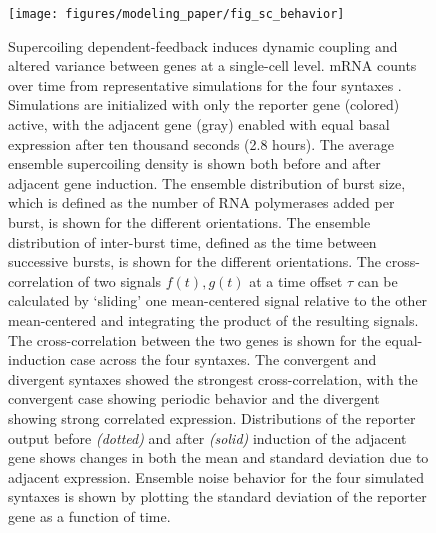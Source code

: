 \documentclass[11pt]{article}
\begin{document}
\begin{figure}[htbp]
    \centering
    {\texttt{[image: figures/modeling\_paper/fig\_sc\_behavior]}
    \label{fig:sc_examples}
    \label{fig:sc_density}
    \label{fig:burst_size_dynamics}
    \label{fig:interburst_time_dynamics}
    \label{fig:cross_correlation_cartoon}
    \label{fig:orientation_cross_correlation}
    \label{fig:output_distribution_by_orientation_dynamics}
    \label{fig:noise_by_orientation}
    }
\end{figure}
\begin{figure}[htbp]
    \ContinuedFloat
    \caption{Supercoiling dependent-feedback induces dynamic coupling and altered variance between genes at a single-cell level.
         mRNA counts over time from representative simulations for the four syntaxes . Simulations are initialized with only the reporter gene (colored) active, with the adjacent gene (gray) enabled with equal basal expression after ten thousand seconds (2.8 hours). 
         The average ensemble supercoiling density is shown both before and after adjacent gene induction.
         The ensemble distribution of burst size, which is defined as the number of RNA polymerases added per burst, is shown for the different orientations. 
         The ensemble distribution of inter-burst time, defined as the time between successive bursts, is shown for the different orientations.
         The cross-correlation of two signals \(f(t), g(t)\) at a time offset \(\tau\) can be calculated by `sliding' one mean-centered signal relative to the other mean-centered and integrating the product of the resulting signals.
         The cross-correlation between the two genes is shown for the equal-induction case across the four syntaxes. The convergent and divergent syntaxes showed the strongest cross-correlation, with the convergent case showing periodic behavior and the divergent showing strong correlated expression.
         Distributions of the reporter output before \textit{(dotted)} and after \textit{(solid)} induction of the adjacent gene shows changes in both the mean and standard deviation due to adjacent expression.
         Ensemble noise behavior for the four simulated syntaxes is shown by plotting the standard deviation of the reporter gene as a function of time.
    }
    \label{fig:top:single_cell_behavior}
\end{figure}
\end{document}
